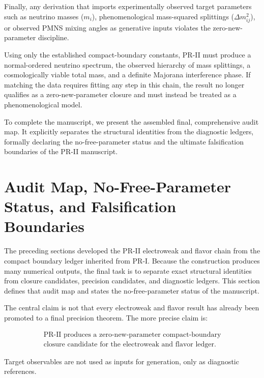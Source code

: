 \documentclass[11pt]{article}
\begin{document}
Finally, any derivation that imports experimentally observed target parameters such as neutrino masses ($m_i$), phenomenological mass-squared splittings ($\Delta m_{ij}^2$), or observed PMNS mixing angles as generative inputs violates the zero-new-parameter discipline. 

Using only the established compact-boundary constants, PR-II must produce a normal-ordered neutrino spectrum, the observed hierarchy of mass splittings, a cosmologically viable total mass, and a definite Majorana interference phase. If matching the data requires fitting any step in this chain, the result no longer qualifies as a zero-new-parameter closure and must instead be treated as a phenomenological model.

To complete the manuscript, we present the assembled final, comprehensive audit map. It explicitly separates the structural identities from the diagnostic ledgers, formally declaring the no-free-parameter status and the ultimate falsification boundaries of the PR-II manuscript.

\section{Audit Map, No-Free-Parameter Status, and Falsification Boundaries}
\label{sec:pr2_audit_map_no_free_parameter_status}

The preceding sections developed the PR-II electroweak and flavor chain from the compact boundary ledger inherited from PR-I. 
Because the construction produces many numerical outputs, the final task is to separate exact structural identities from closure candidates, precision candidates, and diagnostic ledgers. 
This section defines that audit map and states the no-free-parameter status of the manuscript.

The central claim is not that every electroweak and flavor result has already been promoted to a final precision theorem. 
The more precise claim is:

\begin{equation}
\boxed{
\begin{array}{c}
\text{PR-II produces a zero-new-parameter compact-boundary} \\
\text{closure candidate for the electroweak and flavor ledger.}
\end{array}
}
\end{equation}

Target observables are not used as inputs for generation, only as diagnostic references.
\end{document}
